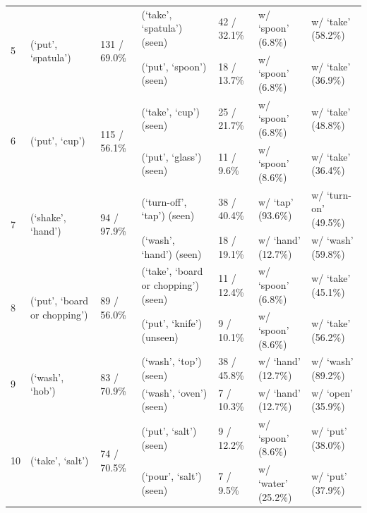 \begin{table}[t]
{\begin{tabular}{l l l l l l l}
\midrule
\multirow{2}{*}{5} & \multirow{2}{*}{(`put', `spatula')} & \multirow{2}{*}{131 / 69.0\%} & (`take', `spatula') (seen) & 42 / 32.1\% & w/ `spoon' (6.8\%) & w/ `take' (58.2\%) \\
&&& (`put', `spoon') (seen) & 18 / 13.7\% & w/ `spoon' (6.8\%) & w/ `take' (36.9\%) \\
\midrule
\multirow{2}{*}{6} & \multirow{2}{*}{(`put', `cup')} & \multirow{2}{*}{115 / 56.1\%} & (`take', `cup') (seen) & 25 / 21.7\% & w/ `spoon' (6.8\%) & w/ `take' (48.8\%) \\
&&& (`put', `glass') (seen) & 11 / 9.6\% & w/ `spoon' (8.6\%) & w/ `take' (36.4\%) \\
\midrule
\multirow{2}{*}{7} & \multirow{2}{*}{(`shake', `hand')} & \multirow{2}{*}{94 / 97.9\%} & (`turn-off', `tap') (seen) & 38 / 40.4\% & w/ `tap' (93.6\%) & w/ `turn-on' (49.5\%) \\
&&& (`wash', `hand') (seen) & 18 / 19.1\% & w/ `hand' (12.7\%) & w/ `wash' (59.8\%) \\
\midrule
\multirow{2}{*}{8} & \multirow{2}{*}{(`put', `board or chopping')} & \multirow{2}{*}{89 / 56.0\%} & (`take', `board or chopping') (seen) & 11 / 12.4\% & w/ `spoon' (6.8\%) & w/ `take' (45.1\%) \\
&&& (`put', `knife') (unseen) & 9 / 10.1\% & w/ `spoon' (8.6\%) & w/ `take' (56.2\%) \\
\midrule
\multirow{2}{*}{9} & \multirow{2}{*}{(`wash', `hob')} & \multirow{2}{*}{83 / 70.9\%} & (`wash', `top') (seen) & 38 / 45.8\% & w/ `hand' (12.7\%) & w/ `wash' (89.2\%) \\
&&& (`wash', `oven') (seen) & 7 / 10.3\% & w/ `hand' (12.7\%) & w/ `open' (35.9\%) \\
\midrule
\multirow{2}{*}{10} & \multirow{2}{*}{(`take', `salt')} & \multirow{2}{*}{74 / 70.5\%} & (`put', `salt') (seen) & 9 / 12.2\% & w/ `spoon' (8.6\%) & w/ `put' (38.0\%) \\
&&& (`pour', `salt') (seen) & 7 / 9.5\% & w/ `water' (25.2\%) & w/ `put' (37.9\%) \\

\bottomrule
\end{tabular}
}
\label{tab:failure_mode_epic_com}
\end{table}
